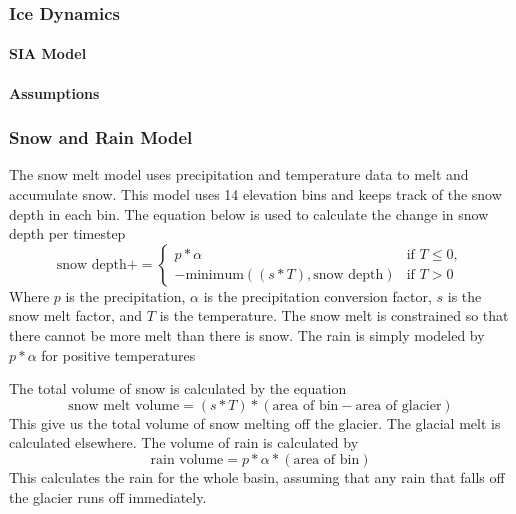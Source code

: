 \documentclass{article}
\begin{document}
\subsubsection{Ice Dynamics}
\paragraph{SIA Model} 
\paragraph{Assumptions}

\subsubsection{Snow and Rain Model}
The snow melt model uses precipitation and temperature data to melt and accumulate snow. This model uses 14 elevation bins and keeps track 
of the snow depth in each bin. The equation below is used to calculate the change in snow depth per timestep 
$$\text{snow depth} += 
\begin{cases} 
  p*\alpha & \text{if } T \leq 0,\\
  -\text{minimum}((s*T),\text{snow depth}) & \text{if } T > 0
\end{cases}$$
Where $p$ is the precipitation, $\alpha$ is the precipitation conversion factor, $s$ is the snow melt factor, and $T$ is 
the temperature. The snow melt is constrained so that there cannot be more melt than there is snow. The rain is simply modeled by $p*\alpha$ 
for positive temperatures

The total volume of snow is calculated by the equation
$$\text{snow melt volume}=(s*T)*(\text{area of bin}-\text{area of glacier})$$
This give us the total volume of snow melting off the glacier. The glacial melt is calculated elsewhere. The volume of rain is calculated by
$$\text{rain volume}=p*\alpha*(\text{area of bin})$$
This calculates the rain for the whole basin, assuming that any rain that falls off the glacier runs off immediately.
\end{document}
